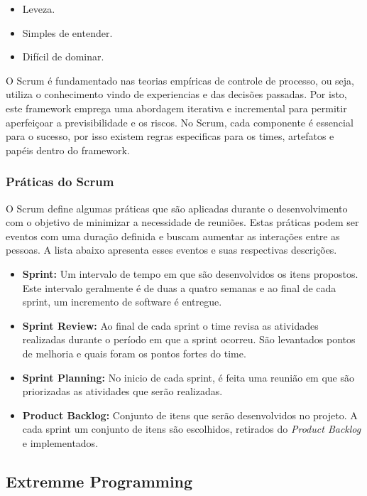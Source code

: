 \begin{itemize}
    \item Leveza.
    \item Simples de entender.
    \item Difícil de dominar.
\end{itemize}

O Scrum é fundamentado nas teorias empíricas de controle de processo, ou seja, utiliza o conhecimento vindo de experiencias e das decisões passadas. Por isto, este  framework emprega uma abordagem iterativa e incremental para permitir aperfeiçoar a previsibilidade e os riscos. No Scrum, cada componente é essencial para o sucesso, por isso existem regras especificas para os times, artefatos e papéis dentro do framework.

\subsubsection{Práticas do Scrum}
\label{est:sof:met:pra}

O Scrum define algumas práticas que são aplicadas durante o desenvolvimento com o objetivo de minimizar a necessidade de reuniões. Estas práticas podem ser eventos com uma duração definida e buscam aumentar as interações entre as pessoas. A lista abaixo apresenta esses eventos e suas respectivas descrições.

\begin{itemize}
    \item \textbf{Sprint:} Um intervalo de tempo em que são desenvolvidos os itens
        propostos. Este intervalo geralmente é de duas a quatro semanas e ao final
        de cada sprint, um incremento de software é entregue.
    \item \textbf{Sprint Review:} Ao final de cada sprint o time revisa as atividades
        realizadas durante o período em que a sprint ocorreu. São levantados pontos de
        melhoria e quais foram os pontos fortes do time.
    \item \textbf{Sprint Planning:} No inicio de cada sprint, é feita uma reunião em
        que são priorizadas as atividades que serão realizadas.
    \item \textbf{Product Backlog:} Conjunto de itens que serão desenvolvidos no projeto.
        A cada sprint um conjunto de itens são escolhidos, retirados do \textit{Product
        Backlog} e implementados.
\end{itemize}

\subsection{Extremme Programming}




